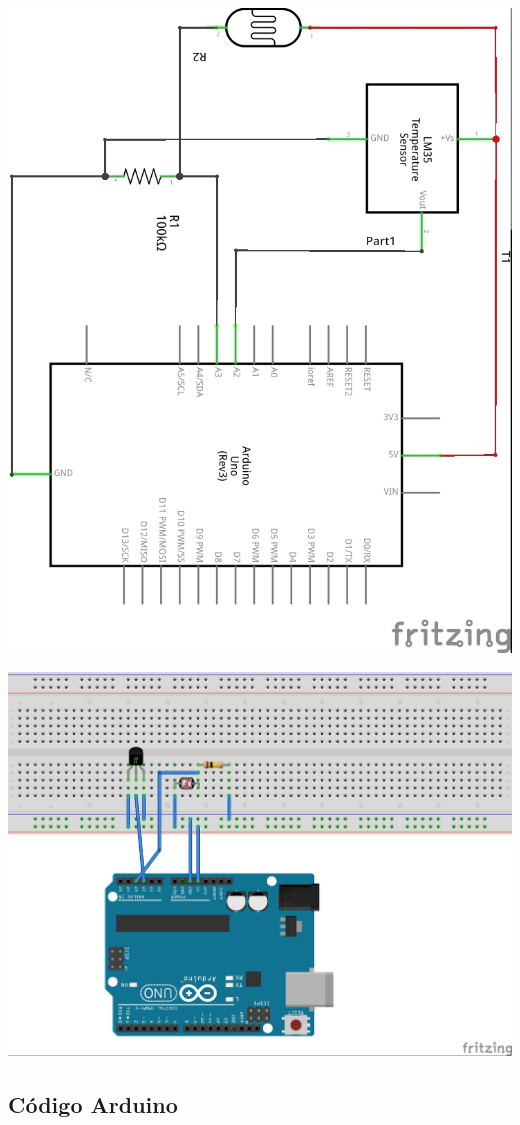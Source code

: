\documentclass[12pt, a4paper, oneside, titlepage]{article}
\begin{document}
\includegraphics[width=0.9\linewidth,keepaspectratio]{img/luz_temp_sensor_schem.jpg} 

\includegraphics[width=0.9\linewidth,keepaspectratio]{img/luz_temp_sensor_bb.jpg} 

\subsection{Código Arduino}
\end{document}
